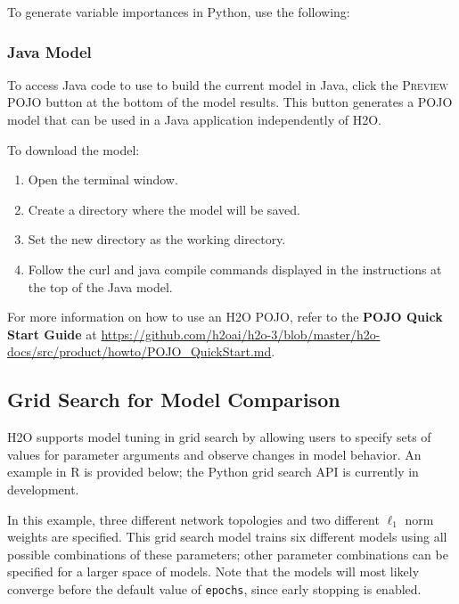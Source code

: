 {{
\newpage
\waterExampleInPython
To generate variable importances in Python, use the following: 


\subsubsection{Java Model} 

To access Java code to use to build the current model in Java, click the \textsc{Preview POJO} button at the
bottom of the model results. This button generates a POJO model that can be used in a Java application independently of H2O. 

To download the model:
\begin{enumerate}
\item Open the terminal window.
\item Create a directory where the model will be saved.
\item Set the new directory as the working directory.
\item Follow the curl and java compile commands displayed in the instructions at the top of the Java model.
\end{enumerate}

For more information on how to use an H2O POJO, refer to the \textbf{POJO Quick Start Guide} at {\url{https://github.com/h2oai/h2o-3/blob/master/h2o-docs/src/product/howto/POJO_QuickStart.md}}. 

\subsection{Grid Search for Model Comparison} 
\label{ssec:GridSearch}

H2O supports model tuning in  grid search by allowing users to specify sets of values for parameter arguments and observe changes in model behavior. An example in R is provided below; the Python grid search API is currently in development.   

In this example, three different network topologies and two different $\ell_1$ norm weights are specified. This grid search model trains six different models using all possible combinations of these parameters; other parameter combinations can be specified for a larger space of models. Note that the models will most likely converge before the default value of \texttt{epochs}, since early stopping is enabled.

}}
